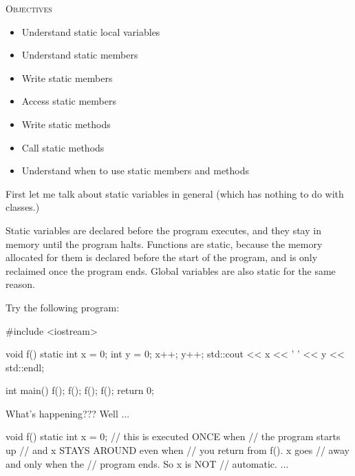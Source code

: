 \newpage{}

\textsc{Objectives}
\begin{itemize}
\item Understand static local variables
\item Understand static members
\item Write static members
\item Access static members
\item Write static methods
\item Call static methods
\item Understand when to use static members and methods
\end{itemize}


\newpage{}

First let me talk about static variables in general (which has nothing
to do with classes.)

Static variables are declared before the program executes, and they stay
in memory until the program halts. Functions are static, because the
memory allocated for them is declared before the start of the program,
and is only reclaimed once the program ends. Global variables are also
static for the same reason.

Try the following program:

\begin{consolethree}[escapeinside=||]
#include <iostream>

void f()
{
    static int x = 0;
    int y = 0;
    x++; y++;
    std::cout << x << ' ' << y << std::endl;
}

int main()
{
    f(); f(); f(); f();
    return 0;
}
\end{consolethree}

What's happening??? Well ...

\begin{consolethree}[escapeinside=||]
void f()
{
    static int x = 0; // this is executed ONCE when
                      // the program starts up
                      // and x STAYS AROUND even when
                      // you return from f(). x goes
                      // away and only when the
                      // program ends. So x is NOT
                      // automatic.
    ...
}
\end{consolethree}



\newpage{}

